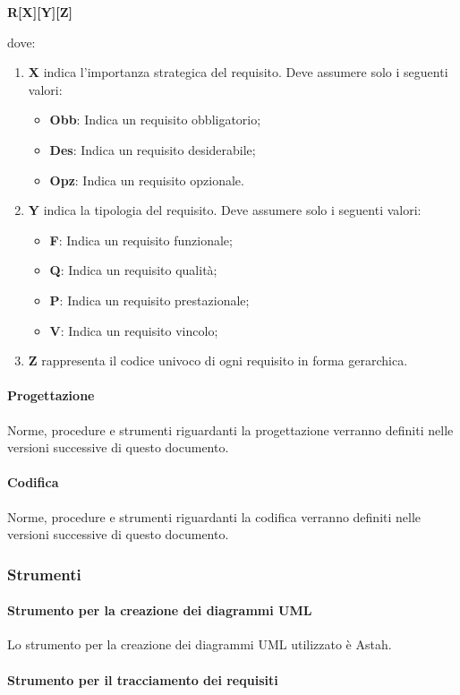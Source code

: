 \documentclass[../NormeProgetto.tex]{subfiles}
\begin{document}
				\begin{center}\textbf{R[X][Y][Z]}\end{center} dove:
					\begin{enumerate}
						\item \textbf{X} indica l'importanza strategica del requisito. Deve assumere solo i seguenti valori:
						\begin{itemize}
							\item \textbf{Obb}: Indica un requisito obbligatorio;
							\item \textbf{Des}: Indica un requisito desiderabile;
							\item \textbf{Opz}: Indica un requisito opzionale.
						\end{itemize}
						\item \textbf{Y} indica la tipologia del requisito. Deve assumere solo i seguenti valori:
						\begin{itemize}
							\item \textbf{F}: Indica un requisito funzionale;
							\item \textbf{Q}: Indica un requisito qualità;
							\item \textbf{P}: Indica un requisito prestazionale;
							\item \textbf{V}: Indica un requisito vincolo;
						\end{itemize}
						\item \textbf{Z} rappresenta il codice univoco di ogni requisito in forma gerarchica.
					\end{enumerate}
			\paragraph{Progettazione}
			Norme, procedure e strumenti riguardanti la progettazione verranno definiti nelle versioni successive di questo documento.
			\paragraph{Codifica}
			Norme, procedure e strumenti riguardanti la codifica verranno definiti nelle versioni successive di questo documento.
		\subsubsection{Strumenti}
			\paragraph{Strumento per la creazione dei diagrammi UML}
			Lo strumento per la creazione dei diagrammi UML utilizzato è Astah.
			\paragraph{Strumento per il tracciamento dei requisiti}
\end{document}
